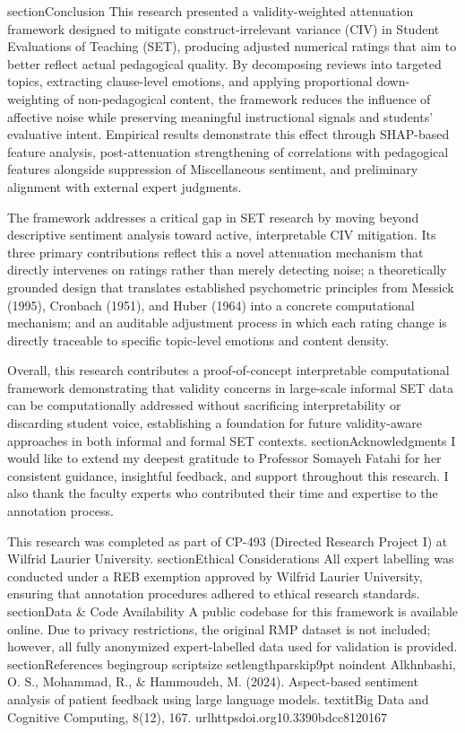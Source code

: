 section{Conclusion}
This research presented a validity-weighted attenuation framework designed to mitigate construct-irrelevant variance (CIV) in Student Evaluations of Teaching (SET), producing adjusted numerical ratings that aim to better reflect actual pedagogical quality. By decomposing reviews into targeted topics, extracting clause-level emotions, and applying proportional down-weighting of non-pedagogical content, the framework reduces the influence of affective noise while preserving meaningful instructional signals and students' evaluative intent. Empirical results demonstrate this effect through SHAP-based feature analysis, post-attenuation strengthening of correlations with pedagogical features alongside suppression of Miscellaneous sentiment, and preliminary alignment with external expert judgments.

The framework addresses a critical gap in SET research by moving beyond descriptive sentiment analysis toward active, interpretable CIV mitigation. Its three primary contributions reflect this a novel attenuation mechanism that directly intervenes on ratings rather than merely detecting noise; a theoretically grounded design that translates established psychometric principles from Messick (1995), Cronbach (1951), and Huber (1964) into a concrete computational mechanism; and an auditable adjustment process in which each rating change is directly traceable to specific topic-level emotions and content density.

Overall, this research contributes a proof-of-concept interpretable computational framework demonstrating that validity concerns in large-scale informal SET data can be computationally addressed without sacrificing interpretability or discarding student voice, establishing a foundation for future validity-aware approaches in both informal and formal SET contexts.
section{Acknowledgments}
I would like to extend my deepest gratitude to Professor Somayeh Fatahi for her consistent guidance, insightful feedback, and support throughout this research. I also thank the faculty experts who contributed their time and expertise to the annotation process. 

This research was completed as part of CP-493 (Directed Research Project I) at Wilfrid Laurier University.
section{Ethical Considerations}
All expert labelling was conducted under a REB exemption approved by Wilfrid Laurier University, ensuring that annotation procedures adhered to ethical research standards.
section{Data & Code Availability}
A public codebase for this framework is available online. Due to privacy restrictions, the original RMP dataset is not included; however, all fully anonymized expert-labelled data used for validation is provided.
section{References} 
begingroup
scriptsize 
setlength{parskip}{9pt}
noindent
Alkhnbashi, O. S., Mohammad, R., & Hammoudeh, M. (2024). Aspect-based sentiment analysis of patient feedback using large language models. textit{Big Data and Cognitive Computing, 8}(12), 167. url{httpsdoi.org10.3390bdcc8120167}

